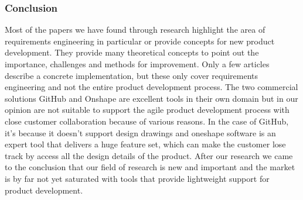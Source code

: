     \subsubsection*{Conclusion}
    Most of the papers we have found through research highlight the area of requirements engineering in particular or provide concepts for new product development. They provide many theoretical concepts to point out the importance, challenges and methods for improvement. Only a few articles describe a concrete implementation, but these only cover requirements engineering and not the entire product development process. The two commercial solutions GitHub and Onshape are excellent tools in their own domain but in our opinion are not suitable to support the agile product development process with close customer collaboration because of various reasons. In the case of GitHub, it's because it doesn't support design drawings and oneshape software is an expert tool that delivers a huge feature set, which can make the customer lose track by access all the design details of the product. After our research we came to the conclusion that our field of research is new and important and the market is by far not yet saturated with tools that provide lightweight support for product development.
